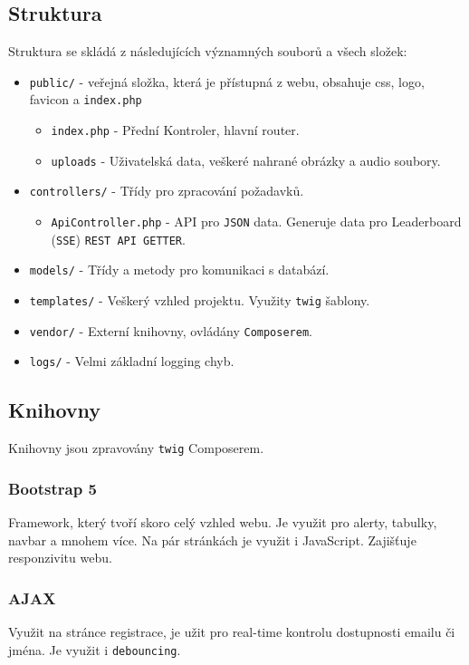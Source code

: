 \documentclass[12pt, a4paper]{article}
\begin{document}
\subsection{Struktura}
Struktura se skládá z následujících významných souborů a všech složek:
\begin{itemize}
\item \verb|public/| - veřejná složka, která je přístupná z webu, obsahuje css, logo, favicon a \verb|index.php|
\begin{itemize}
\item \verb|index.php| - Přední Kontroler, hlavní router.
\item \verb|uploads| - Uživatelská data, veškeré nahrané obrázky a audio soubory.
\end{itemize}
\item \verb|controllers/| - Třídy pro zpracování požadavků.
\begin{itemize}
\item \verb|ApiController.php| - API pro \verb|JSON| data. Generuje data pro Leaderboard (\verb|SSE|) \verb|REST API GETTER|.
\end{itemize}
\item \verb|models/| - Třídy a metody pro komunikaci s databází.
\item \verb|templates/| - Veškerý vzhled projektu. Využity \verb|twig| šablony.
\item \verb|vendor/| - Externí knihovny, ovládány \verb|Composerem|.
\item \verb|logs/| - Velmi základní logging chyb.
\end{itemize}

\subsection{Knihovny}
Knihovny jsou zpravovány \verb|twig| Composerem.

\subsubsection{Bootstrap 5}
Framework, který tvoří skoro celý vzhled webu. Je využit pro alerty, tabulky, navbar a mnohem více.
Na pár stránkách je využit i JavaScript. Zajišťuje responzivitu webu.

\subsubsection{AJAX}
Využit na stránce registrace, je užit pro real-time kontrolu dostupnosti emailu či jména. Je využit i \verb|debouncing|.
\end{document}
